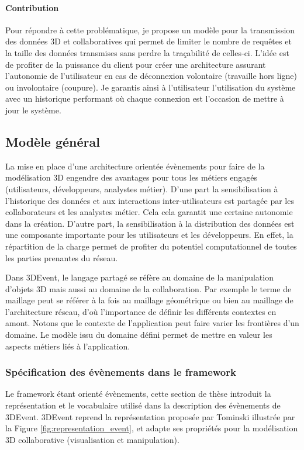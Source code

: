 \paragraph{Contribution}
Pour répondre à cette problématique, je propose un modèle pour la 
transmission des données 3D et collaboratives qui permet de  limiter  le nombre 
de requêtes et la taille des données transmises sans perdre la traçabilité de 
celles-ci. L'idée est de profiter de la puissance du client pour créer une 
architecture assurant l'autonomie de l'utilisateur en cas de déconnexion volontaire 
(travaille hors ligne) ou involontaire (coupure). Je garantis ainsi à l'utilisateur 
l'utilisation du système avec un historique performant où chaque connexion est 
l'occasion de mettre à jour le système.


\subsection{Modèle général}
La mise en place d'une architecture orientée évènements pour faire de la modélisation 3D engendre des avantages pour tous les métiers engagés (utilisateurs, développeurs, analystes 
métier).
D'une part la sensibilisation à l'historique des 
données et aux interactions 
inter-utilisateurs est partagée par les collaborateurs et les analystes métier. Cela cela 
garantit une certaine autonomie dans la création. D'autre part, 
la sensibilisation à la distribution des données est une composante 
importante pour les utilisateurs et les développeurs. En effet, la répartition 
de la charge permet de profiter du potentiel computationnel de toutes les parties 
prenantes du réseau. 

Dans 3DEvent, le langage partagé se réfère au domaine de la manipulation 
d'objets 3D mais aussi au domaine de la collaboration. Par exemple le terme de 
maillage peut se référer à la fois au maillage géométrique ou bien au maillage de 
l'architecture réseau, d'où l'importance de définir les différents contextes en amont. 
Notons que le contexte de l'application peut faire varier les frontières d'un 
domaine. Le modèle issu du domaine défini permet de mettre en valeur les 
aspects métiers liés à l'application.

\subsubsection{Spécification des évènements dans le framework}
Le framework étant orienté évènements, cette section de thèse introduit la représentation et 
le vocabulaire utilisé dans la description des évènements de 3DEvent. 3DEvent 
reprend la représentation proposée par Tominski \cite{Doktor-ingenieur2006} 
illustrée par la Figure \ref{fig:representation_event}, et adapte ses propriétés pour 
la modélisation 3D collaborative (visualisation et manipulation). 

